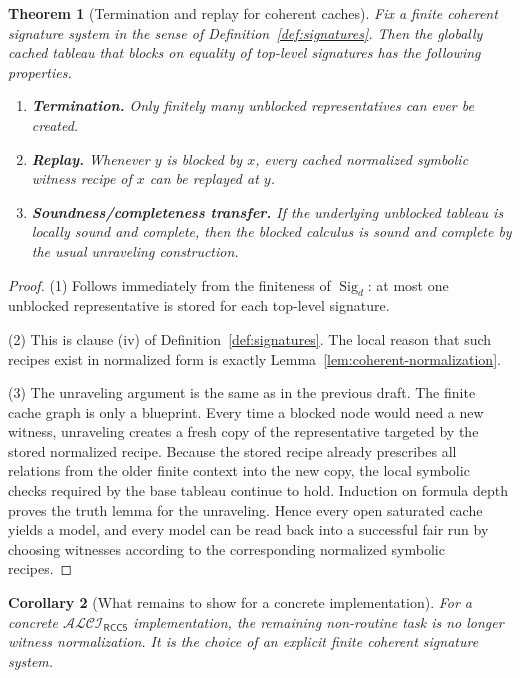 \documentclass[11pt]{article}
\newtheorem{theorem}{Theorem}[section]
\newtheorem{corollary}[theorem]{Corollary}
\theoremstyle{definition}
\newcommand{\ALCIRCCFive}{\mathcal{ALCI}_{\mathsf{RCC5}}}
\newcommand{\Sig}{\operatorname{Sig}}
\begin{document}
\begin{theorem}[Termination and replay for coherent caches]\label{thm:metatheorem}
Fix a finite coherent signature system in the sense of Definition~\ref{def:signatures}. Then the globally cached tableau that blocks on equality of top-level signatures has the following properties.
\begin{enumerate}[label=(\arabic*)]
  \item \textbf{Termination.} Only finitely many unblocked representatives can ever be created.
  \item \textbf{Replay.} Whenever $y$ is blocked by $x$, every cached normalized symbolic witness recipe of $x$ can be replayed at $y$.
  \item \textbf{Soundness/completeness transfer.} If the underlying unblocked tableau is locally sound and complete, then the blocked calculus is sound and complete by the usual unraveling construction.
\end{enumerate}
\end{theorem}

\begin{proof}
(1) Follows immediately from the finiteness of $\Sig_d$: at most one unblocked representative is stored for each top-level signature.

(2) This is clause (iv) of Definition~\ref{def:signatures}. The local reason that such recipes exist in normalized form is exactly Lemma~\ref{lem:coherent-normalization}.

(3) The unraveling argument is the same as in the previous draft. The finite cache graph is only a blueprint. Every time a blocked node would need a new witness, unraveling creates a fresh copy of the representative targeted by the stored normalized recipe. Because the stored recipe already prescribes all relations from the older finite context into the new copy, the local symbolic checks required by the base tableau continue to hold. Induction on formula depth proves the truth lemma for the unraveling. Hence every open saturated cache yields a model, and every model can be read back into a successful fair run by choosing witnesses according to the corresponding normalized symbolic recipes.
\end{proof}

\begin{corollary}[What remains to show for a concrete implementation]\label{cor:remains}
For a concrete $\ALCIRCCFive$ implementation, the remaining non-routine task is no longer witness normalization. It is the choice of an explicit finite coherent signature system.
\end{corollary}
\end{document}
